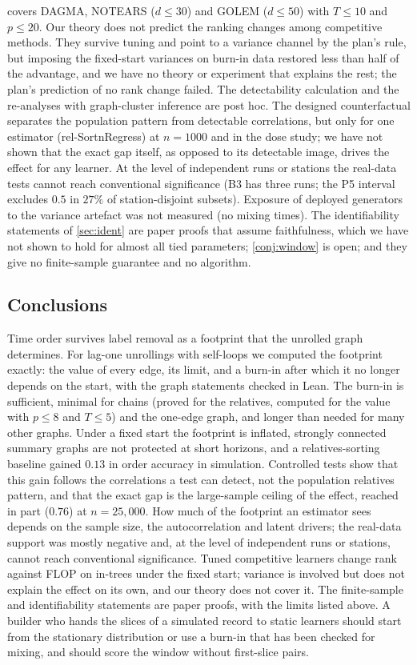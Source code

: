 \documentclass[pdflatex,sn-apa]{sn-jnl}
\theoremstyle{thmstyleone}
\theoremstyle{thmstylethree}
\theoremstyle{thmstyletwo}
\begin{document}
covers DAGMA, NOTEARS ($d\le30$) and GOLEM ($d\le50$) with $T\le10$ and
$p\le20$. Our theory does not predict the ranking changes among competitive
methods. They survive tuning and point to a variance channel by the plan's
rule, but imposing the fixed-start variances on burn-in data restored less than
half of the advantage, and we have no theory or experiment that explains the
rest; the plan's prediction of no rank change failed. The detectability calculation and the re-analyses with
graph-cluster inference are post hoc. The designed counterfactual separates the
population pattern from detectable correlations, but only for one estimator
(rel-SortnRegress) at $n=1000$ and in the dose study; we have not shown that the
exact gap itself, as opposed to its detectable image, drives the effect for any
learner. At the level of independent runs or stations the real-data tests
cannot reach conventional significance (B3 has three runs; the P5 interval
excludes $0.5$ in $27\%$ of station-disjoint subsets). Exposure of deployed generators to the variance
artefact was not measured (no mixing times). The identifiability statements
of \cref{sec:ident} are paper proofs that assume faithfulness, which we have
not shown to hold for almost all tied parameters; \cref{conj:window} is open;
and they give no finite-sample guarantee and no algorithm.

\subsection{Conclusions}

Time order survives label removal as a footprint that the unrolled graph
determines. For lag-one unrollings with self-loops we computed the footprint
exactly: the value of every edge, its limit, and a burn-in after which it no
longer depends on the start, with the graph statements checked in Lean. The
burn-in is sufficient, minimal for chains (proved for the relatives, computed for
the value with $p\le8$ and $T\le5$) and the one-edge graph, and longer than needed
for many other graphs. Under a fixed start the footprint is
inflated, strongly connected summary graphs are not protected at short
horizons, and a relatives-sorting baseline gained $0.13$ in order accuracy in
simulation. Controlled tests show that this gain follows the correlations a
test can detect, not the population relatives pattern, and that the exact gap is
the large-sample ceiling of the effect, reached in part ($0.76$) at
$n=25{,}000$. How much of the footprint an estimator sees depends on the sample
size, the autocorrelation and latent drivers; the real-data support was mostly
negative and, at the level of independent runs or stations, cannot reach
conventional significance. Tuned competitive learners change rank against FLOP
on in-trees under the fixed start; variance is involved but does not explain the
effect on its own, and our theory does not cover it. The finite-sample and
identifiability statements are paper proofs, with the limits listed above. A
builder who hands the slices of a simulated record to static learners should
start from the stationary distribution or use a burn-in that has been checked
for mixing, and should score the window without first-slice pairs.
\end{document}
